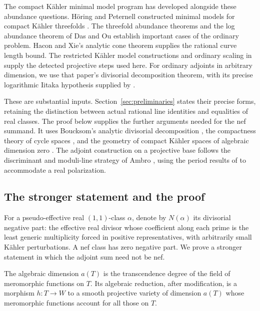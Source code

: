 The compact K\"ahler minimal model program has developed alongside
these abundance questions. H\"oring and Peternell constructed minimal
models for compact K\"ahler threefolds \cite{HoeringPeternell2016}.
The threefold abundance theorems
\cite{CHP2016,CHP2023} and the log abundance theorem of Das and Ou
\cite{DasOu2024,DasOu2026} establish important cases of the ordinary problem.
Hacon and Xie's analytic cone theorem \cite{HX} supplies the rational
curve length bound. The restricted K\"ahler model constructions and
ordinary scaling in \cite[Section~3]{K} supply the detected projective
steps used here. For ordinary adjoints in arbitrary dimension, we use
that paper's divisorial decomposition theorem, with its precise
logarithmic Iitaka hypothesis supplied by \cite[Corollary~6.2]{LI}.

These are substantial inputs. Section~\ref{sec:preliminaries} states
their precise forms, retaining the distinction between actual
rational line identities and equalities of real classes.
The proof below supplies the further arguments needed for the nef
summand. It uses Boucksom's analytic divisorial decomposition
\cite{Boucksom2004}, the compactness theory of cycle spaces
\cite{Barlet,LiebermanCycles,Fujiki}, and the geometry of compact K\"ahler
spaces of algebraic dimension zero
\cite{COP,BBYv2,Ou}. The adjoint construction on a projective base
follows the discriminant and moduli-line strategy of Ambro
\cite[Theorem~0.2]{Ambro}, using the period results of \cite{LI}
to accommodate a real polarization.

\subsection{The stronger statement and the proof}

For a pseudo-effective real \((1,1)\)-class \(\alpha\), denote by
\(N(\alpha)\) its divisorial negative part: the effective real divisor
whose coefficient along each prime is the least generic multiplicity
forced in positive representatives, with arbitrarily small K\"ahler
perturbations. A nef class has zero negative part.
We prove a stronger statement in which the adjoint sum need not be nef.

The algebraic dimension \(a(T)\) is the transcendence degree of the
field of meromorphic functions on \(T\). Its algebraic reduction,
after modification, is a morphism \(h:T\to W\) to a smooth projective
variety of dimension \(a(T)\) whose meromorphic functions account for
all those on \(T\).

